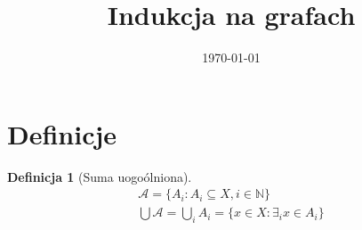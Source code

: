 \documentclass[paper=a4, fontsize=11pt]{article}
\title{	
\huge Indukcja na grafach
}
\date{\normalsize\today}
\begin{document}
\maketitle

\newtheorem{mydef}{Definicja}
\newtheorem{theorem}{Twierdzenie}
\newtheorem{lemma}{Lemat}

\section{Definicje}
\begin{mydef}[Suma uogoólniona] 
\begin{gather*}
\mathcal{A} = \{ A_i : A_i \subseteq X, i \in \mathbb{N} \} \\
\bigcup \mathcal{A} = \bigcup_i A_i = \{ x \in X : \exists_i x \in A_i \}
\end{gather*}
\end{mydef}
\end{document}
